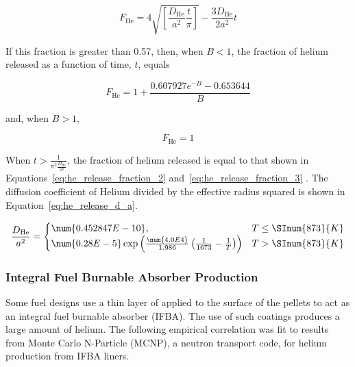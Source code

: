 \begin{equation}
    \label{eq:he_release_fraction_1}
    F_{\text{He}} = 4\sqrt{\left\lbrack \frac{D_{\text{He}}}{a^{2}}\frac{t}{\pi} \right\rbrack} - \frac{3D_{\text{He}}}{2a^{2}}t
\end{equation}

If this fraction is greater than 0.57, then, when \(B < 1\), the fraction of helium released as a
function of time, \(t\), equals

\begin{equation}
    \label{eq:he_release_fraction_2}
    F_{\text{He}} = 1 + \frac{0.607927e^{- B} - 0.653644}{B}
\end{equation}

and, when \(B > 1\),

\begin{equation}
    \label{eq:he_release_fraction_3}
    F_{\text{He}} = 1
\end{equation}

When \(t > \frac{1}{\pi^{2}\frac{D_{\text{He}}}{a^{2}}}\), the fraction of helium released is equal
to that shown in Equations~\ref{eq:he_release_fraction_2} and~\ref{eq:he_release_fraction_3} . The
diffusion coefficient of Helium divided by the effective radius squared is shown in
Equation~\ref{eq:he_release_d_a}.

\begin{equation}
    \label{eq:he_release_d_a}
    \frac{D_{\text{He}}}{a^{2}} = 
        \begin{cases}
            \num{0.452847E-10},                                                                               & T \leq \SInum{873}{K} \\
            \num{0.28E-5}\exp \left( \frac{\num{4.0E4}}{1.986}\left( \frac{1}{1673} - \frac{1}{T} \right) \right) & T > \SInum{873}{K} 
        \end{cases}
\end{equation}

\subsubsection{Integral Fuel Burnable Absorber Production} \label{section:integral-fuel-burnable-absorber-production}

Some fuel designs use a thin layer of  applied to the surface of the pellets to act
as an integral fuel burnable absorber (IFBA). The use of such coatings produces a large amount of
helium. The following empirical correlation was fit to results from Monte Carlo N-Particle (MCNP), a
neutron transport code, for helium production from IFBA liners.


